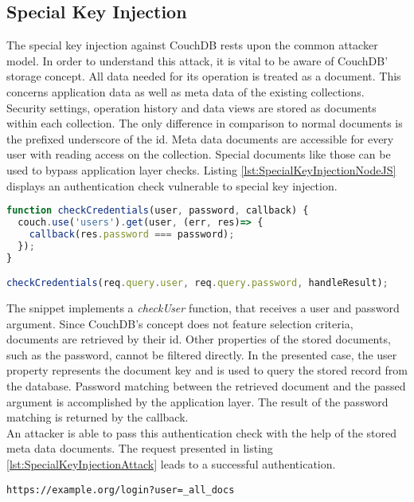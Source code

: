 \subsection{Special Key Injection}
The special key injection against CouchDB rests upon the common attacker model. In order to understand this attack, it is vital to be aware of CouchDB' storage concept. All data needed for its operation is treated as a document. This concerns application data as well as meta data of the existing collections. Security settings, operation history and data views are stored as documents within each collection. The only difference in comparison to normal documents is the prefixed underscore of the id. Meta data documents are accessible for every user with reading access on the collection. Special documents like those can be used to bypass application layer checks. Listing \ref{lst:SpecialKeyInjectionNodeJS} displays an authentication check vulnerable to special key injection. \\

\begin{lstlisting}[caption={Vulnerable NodeJS example for special key injection on CouchDB}, label={lst:SpecialKeyInjectionNodeJS}, language=JavaScript]
function checkCredentials(user, password, callback) {
  couch.use('users').get(user, (err, res)=> {
    callback(res.password === password);
  });
}

checkCredentials(req.query.user, req.query.password, handleResult);
\end{lstlisting}

The snippet implements a \emph{checkUser} function, that receives a user and password argument. Since CouchDB's concept does not feature selection criteria, documents are retrieved by their id. Other properties of the stored documents, such as the password, cannot be filtered directly. In the presented case, the user property represents the document key and is used to query the stored record from the database. Password matching between the retrieved document and the passed argument is accomplished by the application layer. The result of the password matching is returned by the callback. \\

An attacker is able to pass this authentication check with the help of the stored meta data documents. The request presented in listing \ref{lst:SpecialKeyInjectionAttack} leads to a successful authentication.
 
\begin{lstlisting}[caption={Attack vector on CouchDB for speical key injection via HTTP GET}, label={lst:SpecialKeyInjectionAttack}]
https://example.org/login?user=_all_docs
\end{lstlisting}


